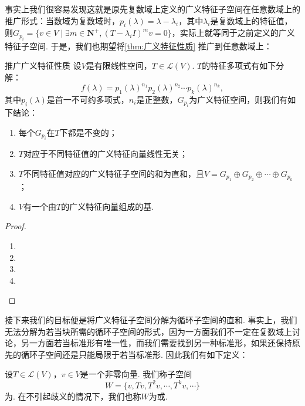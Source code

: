 事实上我们很容易发现这就是原先复数域上定义的广义特征子空间在任意数域上的推广形式：当数域为复数域时，$p_i(\lambda)=\lambda-\lambda_i$，其中$\lambda_i$是复数域上的特征值，则$G_{p_i}=\{v\in V\mid\exists m\in\mathbf{N}^+,(T-\lambda_iI)^mv=0\}$，实际上就等同于之前定义的广义特征子空间. 于是，我们也期望将\autoref{thm:广义特征性质} 推广到任意数域上：
\begin{theorem}{}{推广广义特征性质}
    设$V$是有限线性空间，$T\in \mathcal{L}(V)$. $T$的特征多项式有如下分解：
    \[f(\lambda)=p_1(\lambda)^{n_1}p_2(\lambda)^{n_2}\cdots p_k(\lambda)^{n_k},\]
    其中$p_i(\lambda)$是首一不可约多项式，$n_i$是正整数，$G_{p_i}$为广义特征空间，则我们有如下结论：
    \begin{enumerate}[label=(\arabic*)]
        \item 每个$G_{p_i}$在$T$下都是不变的；
        \item $T$对应于不同特征值的广义特征向量线性无关；
        \item $T$不同特征值对应的广义特征子空间的和为直和，且$V=G_{p_1}\oplus G_{p_2}\oplus\cdots\oplus G_{p_k}$；
        \item $V$有一个由$T$的广义特征向量组成的基.
    \end{enumerate}
\end{theorem}
\begin{proof}
    \begin{enumerate}
        \item
        \item
        \item
        \item
    \end{enumerate}
\end{proof}

接下来我们的目标便是将广义特征子空间分解为循环子空间的直和. 事实上，我们无法分解为若当块所需的循环子空间的形式，因为一方面我们不一定在复数域上讨论，另一方面若当标准形有唯一性，而我们需要找到另一种标准形，如果还保持原先的循环子空间还是只能局限于若当标准形. 因此我们有如下定义：
\begin{definition}{}{}
    设$T\in\mathcal{L}(V)$，$v\in V$是一个非零向量. 我们称子空间
    \[W=\{v,Tv,T^2v,\cdots,T^kv,\cdots\}\]
    为. 在不引起歧义的情况下，我们也称$W$为或.
\end{definition}

